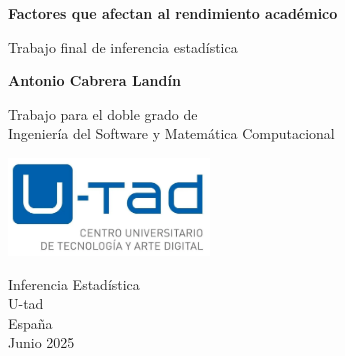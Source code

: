 \begin{titlepage}
    \begin{center}
        \vspace*{1cm}
 
        \Large\textbf{Factores que afectan al rendimiento académico}
 
        \vspace{0.5cm}
            Trabajo final de inferencia estadística
        \vspace{1.5cm}
 
        \textbf{Antonio Cabrera Landín}
 
        \vfill
             
        Trabajo para el doble grado de\\
        Ingeniería del Software y Matemática Computacional\\
             
        \vspace{0.8cm}
      
        \includegraphics[width=0.4\textwidth]{figures/logo-u-tad.png}
             
        Inferencia Estadística\\
        U-tad\\
        España\\
        Junio 2025
             
    \end{center}
 \end{titlepage}

